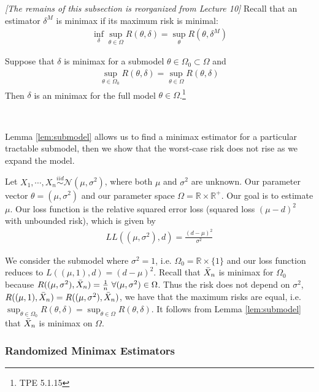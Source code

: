 \textit{[The remains of this subsection is reorganized from Lecture 10]}
Recall that an estimator $\delta^M$ is minimax if its maximum risk is minimal:
\begin{gather}
    \inf_\delta\sup_{\theta\in\Omega}R(\theta,\delta)=\sup_\theta R(\theta,\delta^M)
\end{gather}

\begin{lemma}\label{lem:submodel}
    Suppose that $\delta$ is minimax for a submodel $\theta\in\Omega_0\subset\Omega$ and 
    \begin{gather}
        \sup_{\theta\in\Omega_0}R(\theta,\delta)=\sup_{\theta\in\Omega}R(\theta,\delta)
    \end{gather}
    Then $\delta$ is an minimax for the full model $\theta\in\Omega$.\footnote{
    TPE 5.1.15
    }
\end{lemma}
$~$

Lemma \ref{lem:submodel} allows us to find a minimax estimator for a particular tractable submodel,
then we show that the worst-case risk does not rise as we expand the model.

\begin{example}
    Let $X_1,\cdots,X_n\overset{iid}{\sim}\mathcal{N}(\mu,\sigma^2)$,
    where both $\mu$ and $\sigma^2$ are unknown.
    Our parameter vector $\theta=(\mu,\sigma^2)$ and our parameter space $\Omega=\mathbb{R}\times\mathbb{R}^+$.
    Our goal is to estimate $\mu$. 
    Our loss function is the relative squared error loss 
    (squared loss $(\mu-d)^2$ with unbounded risk), which is given by 
    \begin{gather}
        LL((\mu,\sigma^2),d)=\frac{(d-\mu)^2}{\sigma^2}
    \end{gather}
    
    We consider the submodel where $\sigma^2=1$, i.e. $\Omega_0=\mathbb{R}\times\{1\}$
    and our loss function reduces to $L((\mu,1),d)=(d-\mu)^2$.
    Recall that $\Bar{X}_n$ is minimax for $\Omega_0$ 
    because $R((\mu,\sigma^2),\Bar{X}_n)=\frac{1}{n}~\forall(\mu,\sigma^2)\in\Omega$.
    Thus the risk does not depend on $\sigma^2$, 
    $R((\mu,1),\Bar{X}_n)=R((\mu,\sigma^2),\Bar{X}_n)$, 
    we have that the maximum risks are equal, i.e.
    $\sup_{\theta\in\Omega_0}R(\theta,\delta)=\sup_{\theta\in\Omega}R(\theta,\delta)$.
    It follows from Lemma \ref{lem:submodel} that $\Bar{X}_n$ is minimax on $\Omega$.
\end{example}

\subsubsection{Randomized Minimax Estimators}

